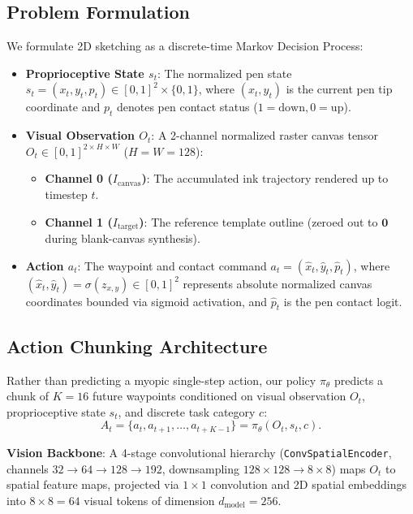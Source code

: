 \documentclass[10pt,twocolumn,letterpaper]{article}
\begin{document}
\subsection{Problem Formulation}
We formulate 2D sketching as a discrete-time Markov Decision Process:
\begin{itemize}
  \item \textbf{Proprioceptive State $s_t$}: The normalized pen state $s_t = (x_t, y_t, p_t) \in [0, 1]^2 \times \{0, 1\}$, where $(x_t, y_t)$ is the current pen tip coordinate and $p_t$ denotes pen contact status ($1 = \text{down}, 0 = \text{up}$).
  \item \textbf{Visual Observation $O_t$}: A 2-channel normalized raster canvas tensor $O_t \in [0, 1]^{2 \times H \times W}$ ($H=W=128$):
  \begin{itemize}
    \item \textbf{Channel 0 ($I_{\text{canvas}}$)}: The accumulated ink trajectory rendered up to timestep $t$.
    \item \textbf{Channel 1 ($I_{\text{target}}$)}: The reference template outline (zeroed out to $\mathbf{0}$ during blank-canvas synthesis).
  \end{itemize}
  \item \textbf{Action $a_t$}: The waypoint and contact command $a_t = (\hat{x}_t, \hat{y}_t, \hat{p}_t)$, where $(\hat{x}_t, \hat{y}_t) = \sigma(z_{x,y}) \in [0, 1]^2$ represents absolute normalized canvas coordinates bounded via sigmoid activation, and $\hat{p}_t$ is the pen contact logit.
\end{itemize}

\subsection{Action Chunking Architecture}
Rather than predicting a myopic single-step action, our policy $\pi_\theta$ predicts a chunk of $K=16$ future waypoints conditioned on visual observation $O_t$, proprioceptive state $s_t$, and discrete task category $c$:
\begin{equation}
  A_t = \{a_t, a_{t+1}, \dots, a_{t+K-1}\} = \pi_\theta(O_t, s_t, c).
\end{equation}

\noindent\textbf{Vision Backbone}: A 4-stage convolutional hierarchy (\texttt{ConvSpatialEncoder}, channels $32 \to 64 \to 128 \to 192$, downsampling $128\times 128 \to 8\times 8$) maps $O_t$ to spatial feature maps, projected via $1\times 1$ convolution and 2D spatial embeddings into $8\times 8 = 64$ visual tokens of dimension $d_{\text{model}} = 256$.
\end{document}
